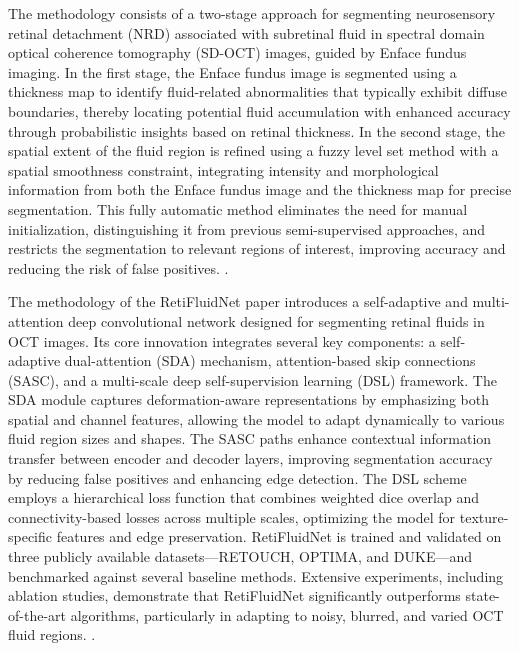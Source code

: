\documentclass{article}
\begin{document}
The methodology consists of a two-stage approach for segmenting neurosensory retinal detachment (NRD) associated with subretinal fluid in spectral domain optical coherence tomography (SD-OCT) images, guided by Enface fundus imaging. In the first stage, the Enface fundus image is segmented using a thickness map to identify fluid-related abnormalities that typically exhibit diffuse boundaries, thereby locating potential fluid accumulation with enhanced accuracy through probabilistic insights based on retinal thickness. In the second stage, the spatial extent of the fluid region is refined using a fuzzy level set method with a spatial smoothness constraint, integrating intensity and morphological information from both the Enface fundus image and the thickness map for precise segmentation. This fully automatic method eliminates the need for manual initialization, distinguishing it from previous semi-supervised approaches, and restricts the segmentation to relevant regions of interest, improving accuracy and reducing the risk of false positives. \cite{wu2021automatic}.

The methodology of the RetiFluidNet paper introduces a self-adaptive and multi-attention deep convolutional network designed for segmenting retinal fluids in OCT images. Its core innovation integrates several key components: a self-adaptive dual-attention (SDA) mechanism, attention-based skip connections (SASC), and a multi-scale deep self-supervision learning (DSL) framework. The SDA module captures deformation-aware representations by emphasizing both spatial and channel features, allowing the model to adapt dynamically to various fluid region sizes and shapes. The SASC paths enhance contextual information transfer between encoder and decoder layers, improving segmentation accuracy by reducing false positives and enhancing edge detection. The DSL scheme employs a hierarchical loss function that combines weighted dice overlap and connectivity-based losses across multiple scales, optimizing the model for texture-specific features and edge preservation. RetiFluidNet is trained and validated on three publicly available datasets—RETOUCH, OPTIMA, and DUKE—and benchmarked against several baseline methods. Extensive experiments, including ablation studies, demonstrate that RetiFluidNet significantly outperforms state-of-the-art algorithms, particularly in adapting to noisy, blurred, and varied OCT fluid regions. \cite{rasti2021retifluidnet}.

\newpage
\clearpage

\end{document}
